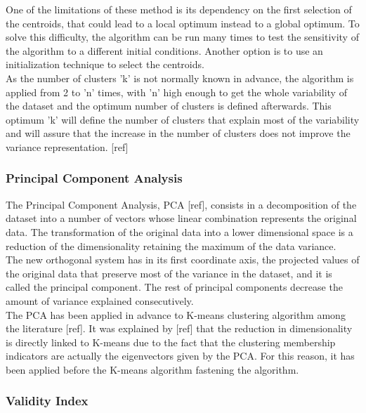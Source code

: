 One of the limitations of these method is its dependency on the first selection of the centroids, that could lead to a local optimum instead to a global optimum. To solve this difficulty, the algorithm can be run many times to test the sensitivity of the algorithm to a different initial conditions. Another option is to use an initialization technique to select the centroids.\\

As the number of clusters 'k' is not normally known in advance, the algorithm is applied from 2 to 'n' times, with 'n' high enough to get the whole variability of the dataset and the optimum number of clusters is defined afterwards. This optimum 'k' will define the number of clusters that explain most of the variability and will assure that the increase in the number of clusters does not improve the variance representation. [ref]\\

\subsubsection{Principal Component Analysis}

The Principal Component Analysis, PCA [ref], consists in a decomposition of the dataset into a number of vectors whose linear combination represents the original data. The transformation of the original data into a lower dimensional space is a reduction of the dimensionality retaining the maximum of the data variance.\\

The new orthogonal system has in its first coordinate axis, the projected values of the original data that preserve most of the variance in the dataset, and it is called the principal component. The rest of principal components decrease the amount of variance explained consecutively.\\

The PCA has been applied in advance to K-means clustering algorithm among the literature [ref]. It was explained by [ref] that the reduction in dimensionality is directly linked to K-means due to the fact that the clustering membership indicators are actually the eigenvectors given by the PCA. For this reason, it has been applied before the K-means algorithm fastening the algorithm.\\

\subsubsection{Validity Index}

